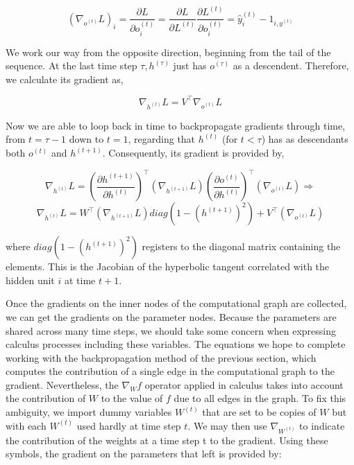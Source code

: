 \begin{equation}
    (\nabla_{o^{(t)}} L)_i = \frac{\partial L}{\partial o^{(t)}_i} = \frac{\partial L}{\partial L^{(t)}} \frac{\partial L^{(t)}}{\partial o^{(t)}_i} = \hat{y}^{(t)}_i - 1_{i,y^{(t)}}\label{eq:equation11}
\end{equation}

We work our way from the opposite direction, beginning from the tail of the sequence.
At the last time step $\tau, h^{(\tau)}$ just has $o^{(\tau)}$ as a descendent.
Therefore, we calculate its gradient as,

\begin{equation}
    \nabla_{h^{(t)}} L = V^\top \nabla_{o^{(t)}} L\label{eq:equation12}
\end{equation}

Now we are able to loop back in time to backpropagate gradients through time, from $t = \tau - 1$ down to $t = 1$,
regarding that $h^{(t)}$ (for $t < \tau$) has as descendants both $o^{(t)}$ and $h^{(t+1)}$.
Consequently, its gradient is provided by,

\begin{equation}
    \nabla_{h^{(t)}} L = (\frac{\partial h^{(t+1)}}{\partial h^{(t)}})^\top (\nabla_{h^{(t+1)}} L) (\frac{\partial o^{(t)}}{\partial h^{(t)}})^\top (\nabla_{o^{(t)}} L) \Rightarrow\label{eq:equation13}
\end{equation}
\begin{equation}
    \nabla_{h^{(t)}} L = W^\top (\nabla_{h^{(t+1)}} L) diag(1-(h^{(t+1)})^2) + V^\top (\nabla_{o^{(t)}} L)\label{eq:equation14}
\end{equation}

where $diag(1-(h^{(t+1)})^2)$ registers to the diagonal matrix containing the elements.
This is the Jacobian of the hyperbolic tangent correlated with the
hidden unit $i$ at time $t+1$.

Once the gradients on the inner nodes of the computational graph are
collected, we can get the gradients on the parameter nodes.
Because the parameters are shared across many time steps, we should take some concern when expressing calculus processes including these variables.
The equations we hope to complete working with the backpropagation method of the previous section,
which computes the contribution of a single edge in the computational graph to the gradient.
Nevertheless, the $\nabla_W f$ operator applied in calculus takes into account the contribution of $W$ to the value of $f$ due to all edges in the graph.
To fix this ambiguity, we import dummy variables $W^{(t)}$ that are set to be copies of $W$ but with each $W^{(t)}$ used hardly at time step $t$.
We may then use $\nabla_{W^{(t)}}$ to indicate the contribution of the weights at a time step t to the gradient.
Using these symbols, the gradient on the parameters that left is provided by:

